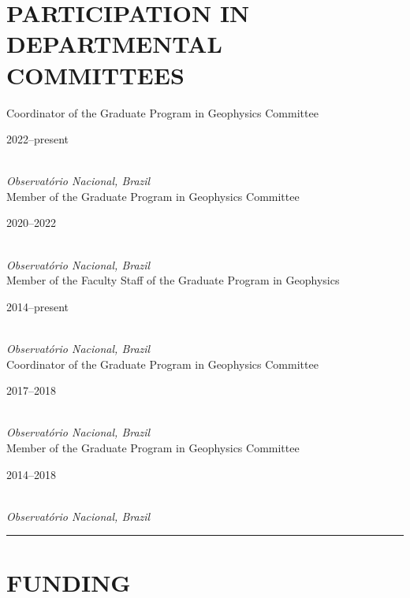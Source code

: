 \documentclass[11pt,a4paper,onecolumn]{article}
\begin{document}
\section*{PARTICIPATION IN DEPARTMENTAL COMMITTEES}{}

\medskip
	
\noindent Coordinator of the Graduate Program in Geophysics Committee \hfill \parbox{0.1\textwidth}{\raggedright 2022--present} \\
\noindent \textsl{Observat\'{o}rio Nacional, Brazil} \vspace{0.5\baselineskip} \\
\noindent Member of the Graduate Program in Geophysics Committee \hfill \parbox{0.1\textwidth}{\raggedright 2020--2022} \\
\noindent \textsl{Observat\'{o}rio Nacional, Brazil} \vspace{0.5\baselineskip} \\
\noindent Member of the Faculty Staff of the Graduate Program in Geophysics \hfill \parbox{0.1\textwidth}{\raggedright 2014--present} \\
\noindent \textsl{Observat\'{o}rio Nacional, Brazil} \vspace{0.5\baselineskip} \\
\noindent Coordinator of the Graduate Program in Geophysics Committee \hfill \parbox{0.1\textwidth}{\raggedright 2017--2018} \\
\noindent \textsl{Observat\'{o}rio Nacional, Brazil} \vspace{0.5\baselineskip} \\
\noindent Member of the Graduate Program in Geophysics Committee \hfill \parbox{0.1\textwidth}{\raggedright 2014--2018} \\
\noindent \textsl{Observat\'{o}rio Nacional, Brazil} \vspace{0.5\baselineskip} \\


\bigskip \hrule

\section*{FUNDING}
\end{document}
